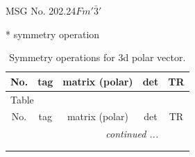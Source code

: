 \documentclass[fleqn,8pt]{jsarticle}
\begin{document}
\setcounter{MaxMatrixCols}{32}

\renewcommand{\tablename}{Table~}
\renewcommand{\figurename}{Figure~}
\begin{center}
\LARGE
MSG No. 202.24\quad$Fm'\bar{3}'$
\end{center}
* symmetry operation
\renewcommand{\arraystretch}{1.3}
\begin{longtable}{ccccc}
\caption{Symmetry operations for 3d polar vector.}
 \\
 \hline \hline
No. & tag & matrix (polar) & det & TR \\ \hline \endfirsthead

\multicolumn{4}{l}{\tablename\ \thetable{}} \\
 \hline \hline
No. & tag & matrix (polar) & det & TR \\ \hline \endhead

 \hline \hline
\multicolumn{4}{r}{\footnotesize\it continued ...} \\ \endfoot

 \hline \hline
\multicolumn{4}{r}{} \\ \endlastfoot


\end{longtable}
\end{document}
